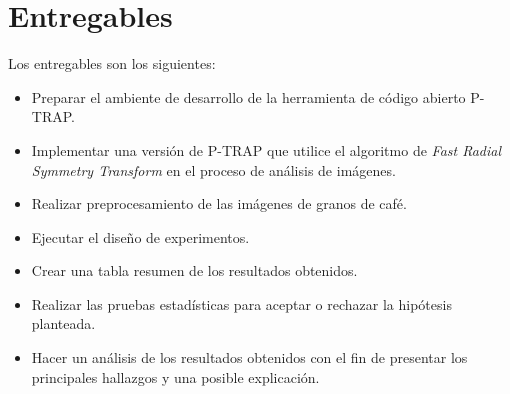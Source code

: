 \section{\textbf{Entregables}}
Los entregables son los siguientes:
\begin{itemize}
\item Preparar el ambiente de desarrollo de la herramienta de c\'odigo abierto P-TRAP.
\item Implementar una versi\'on de P-TRAP que utilice el algoritmo de \textit{Fast Radial Symmetry Transform} en el proceso de an\'alisis de im\'agenes.
\item Realizar preprocesamiento de las im\'agenes de granos de caf\'e.
\item Ejecutar el dise\~no de experimentos.
\item Crear una tabla resumen de los resultados obtenidos.
\item Realizar las pruebas estad\'isticas para aceptar o rechazar la hip\'otesis planteada.
\item Hacer un an\'alisis de los resultados obtenidos con el fin de presentar los principales hallazgos y una posible explicaci\'on.
\end{itemize}


